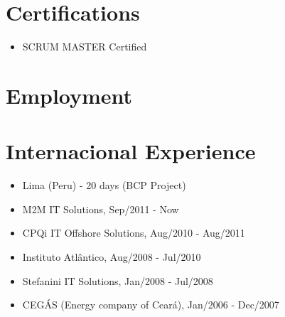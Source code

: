 \documentclass[letterpaper]{article}
\begin{document}
\section*{Certifications}
\begin{itemize}
  \item SCRUM MASTER Certified
\end{itemize}

\section*{Employment}

\section*{Internacional Experience}
\begin{itemize}
  \item Lima (Peru) - 20 days (BCP Project)
\end{itemize}

\begin{itemize}
\item M2M IT Solutions, Sep/2011 - Now
\item CPQi IT Offshore Solutions, Aug/2010 - Aug/2011
\item Instituto Atlântico, Aug/2008 - Jul/2010
\item Stefanini IT Solutions, Jan/2008 - Jul/2008
\item CEGÁS (Energy company of Ceará), Jan/2006 - Dec/2007
\end{itemize}
\end{document}
